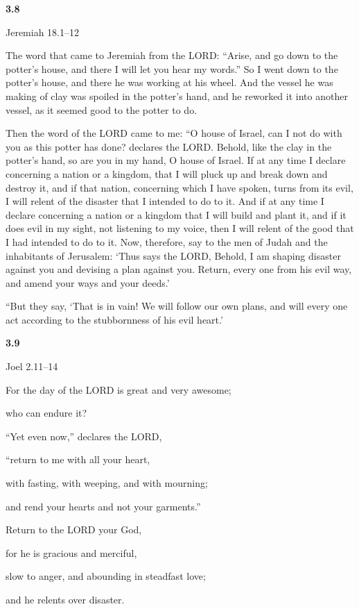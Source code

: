 \documentclass[
]{article}
\newcommand{\RL}[1]{\beginR #1\endR}
\begin{document}
\textbf{3.8}

Jeremiah 18.1--12

The word that came to Jeremiah from the LORD: \RL{``}Arise, and go down
to the potter\RL{'}s house, and there I will let you hear my words.'' So
I went down to the potter\RL{'}s house, and there he was working at his
wheel. And the vessel he was making of clay was spoiled in the
potter\RL{'}s hand, and he reworked it into another vessel, as it seemed
good to the potter to do.

Then the word of the LORD came to me: \RL{``}O house of Israel, can I
not do with you as this potter has done? declares the LORD. Behold, like
the clay in the potter\RL{'}s hand, so are you in my hand, O house of
Israel. If at any time I declare concerning a nation or a kingdom, that
I will pluck up and break down and destroy it, and if that nation,
concerning which I have spoken, turns from its evil, I will relent of
the disaster that I intended to do to it. And if at any time I declare
concerning a nation or a kingdom that I will build and plant it, and if
it does evil in my sight, not listening to my voice, then I will relent
of the good that I had intended to do to it. Now, therefore, say to the
men of Judah and the inhabitants of Jerusalem: \RL{`}Thus says the LORD,
Behold, I am shaping disaster against you and devising a plan against
you. Return, every one from his evil way, and amend your ways and your
deeds.\RL{'}

\RL{``}But they say, \RL{`}That is in vain! We will follow our own
plans, and will every one act according to the stubbornness of his evil
heart.\RL{'}

\textbf{3.9}

Joel 2.11--14

For the day of the LORD is great and very awesome;

who can endure it?

\RL{``}Yet even now,'' declares the LORD,

\RL{``}return to me with all your heart,

with fasting, with weeping, and with mourning;

and rend your hearts and not your garments.''

Return to the LORD your God,

for he is gracious and merciful,

slow to anger, and abounding in steadfast love;

and he relents over disaster.
\end{document}
